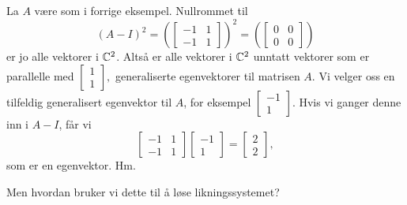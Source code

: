 \begin{ex}
La $A$ være som i forrige eksempel. Nullrommet til 
\[
(A-I)^2=
\left(\begin{bmatrix}
-1 & 1   \\
-1 & 1
\end{bmatrix}\right)^2=
\left(\begin{bmatrix}
0 & 0   \\
0 & 0
\end{bmatrix}\right)
\]
er jo alle vektorer i $\mathbb{C}^2$. Altså er alle vektorer i $\mathbb{C}^2$ unntatt vektorer som er parallelle med 
$
\begin{bmatrix}
1  \\
1 
\end{bmatrix},
$
generaliserte egenvektorer til matrisen $A$.
Vi velger oss en tilfeldig generalisert egenvektor til $A$, for eksempel
$
\begin{bmatrix}
-1  \\
1 
\end{bmatrix}.
$
Hvis vi ganger denne inn i $A-I$, får vi 
\[
\begin{bmatrix}
-1 & 1   \\
-1 & 1
\end{bmatrix}
\begin{bmatrix}
-1    \\
 1
\end{bmatrix}
=
\begin{bmatrix}
2    \\
2
\end{bmatrix},
\]
som er en egenvektor. Hm.
\end{ex}

Men hvordan bruker vi dette til å løse likningssystemet? 

